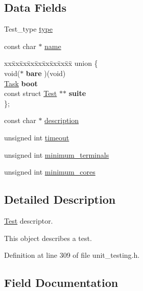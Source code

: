 \subsection*{Data Fields}
\begin{DoxyCompactItemize}
\item 
Test\+\_\+type \hyperlink{structTest_a5074007b777ea0958966027197c17792}{type}
\item 
const char $\ast$ \hyperlink{structTest_ae44674e48b203d9c26e04e09b6fe5b61}{name}
\item 
\begin{tabbing}
xx\=xx\=xx\=xx\=xx\=xx\=xx\=xx\=xx\=\kill
union \{\\
\>void($\ast$ {\bfseries bare} )(void)\\
\>\hyperlink{group__syscalls_gaec3f2f835e105271fbbc00272c0ba984}{Task} {\bfseries boot}\\
\>const struct \hyperlink{structTest}{Test} $\ast$$\ast$ {\bfseries suite}\\
\}; \\

\end{tabbing}\item 
const char $\ast$ \hyperlink{structTest_a294ca3f1114240c908f66216afcad783}{description}
\item 
unsigned int \hyperlink{structTest_a80e78f2e6aeed2a6e5b7c705ce5a1493}{timeout}
\item 
unsigned int \hyperlink{structTest_a2741188633c51b8e3cb545fa3971bf60}{minimum\+\_\+terminals}
\item 
unsigned int \hyperlink{structTest_ac203918837b4c6718a020246e189a95a}{minimum\+\_\+cores}
\end{DoxyCompactItemize}


\subsection{Detailed Description}
\hyperlink{structTest}{Test} descriptor. 

This object describes a test. 

Definition at line 309 of file unit\+\_\+testing.\+h.



\subsection{Field Documentation}
\mbox{\label{structTest_ac6c7a8f3a2061b878d87b8d4f486a65b}} 
